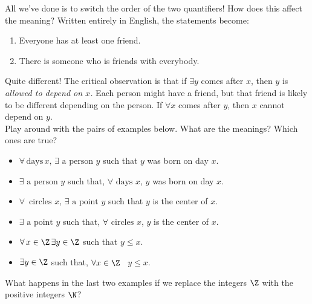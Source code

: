 \noindent All we've done is to switch the order of the two quantifiers! How does this affect the meaning? Written entirely in English, the statements become:
\begin{enumerate}
\item Everyone has at least one friend.
\item There is someone who is friends with everybody.
\end{enumerate}
Quite different! The critical observation is that if $\exists y$ comes after $x$, then $y$ is \emph{allowed to depend on $x$.} Each person might have a friend, but that friend is likely to be different depending on the person. If $\forall x$ comes after $y$, then $x$ cannot depend on $y$.\\

\noindent Play around with the pairs of examples below. What are the meanings? Which ones are true? 
\begin{itemize}\setlength{\itemsep}{0cm}
\item $\forall\,\text{days}\,x,\,\exists\text{ a person }y$ such that $y$ was born on day $x$.
\item $\exists\text{ a person }y$ such that, $\forall\text{ days }x$, $y$ was born on day $x$.\\
\item $\forall\,\text{ circles }x,\,\exists\text{ a point }y$ such that $y$ is the center of $x$.
\item $\exists\text{ a point }y$ such that, $\forall\text{ circles }x$, $y$ is the center of $x$.\\
\item $\forall\,x\in\Z \,\exists y\in\Z$ such that $y\le x$.
\item $\exists y\in\Z$ such that, $\forall x\in\Z$ \, $y\le x$.
\end{itemize}
What happens in the last two examples if we replace the integers $\Z$ with the positive integers $\N$?



